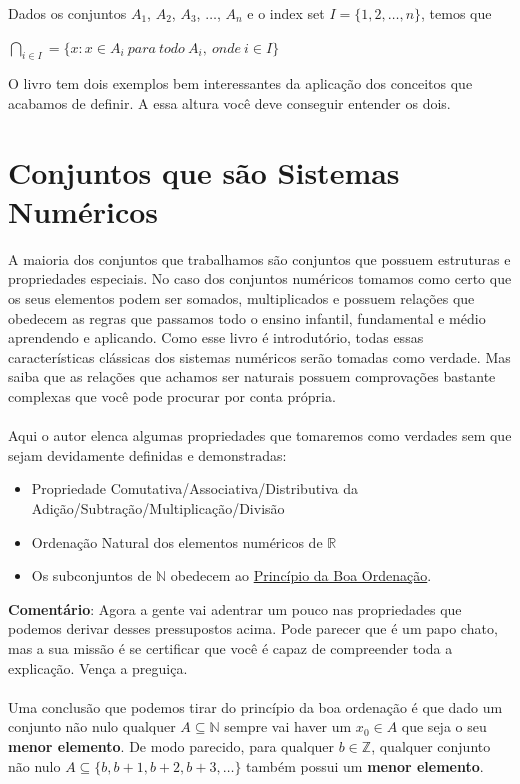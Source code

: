 \documentclass[main.tex]{subfiles}
\begin{document}
\begin{definition}
Dados os conjuntos $A_1$, $A_2$, $A_3$, $\dots$, $A_n$ e o index set $I = \{ 1 , 2 , \dots , n \}$, temos que
\begin{center}
	$\bigcap_{i \in I}\limits = \{ x : x \in A_i \ para \ todo \ A_i, \ onde \  i \in I \}$
\end{center}
\end{definition}

O livro tem dois exemplos bem interessantes da aplicação dos conceitos que acabamos de definir. A essa altura você deve conseguir entender os dois.

\section{Conjuntos que são Sistemas Numéricos}

A maioria dos conjuntos que trabalhamos são conjuntos que possuem estruturas e propriedades especiais. No caso dos conjuntos numéricos tomamos como certo que os seus elementos podem ser somados, multiplicados e possuem relações que obedecem as regras que passamos todo o ensino infantil, fundamental e médio aprendendo e aplicando. Como esse livro é introdutório, todas essas características clássicas dos sistemas numéricos serão tomadas como verdade. Mas saiba que as relações que achamos ser naturais possuem comprovações bastante complexas que você pode procurar por conta própria.
\\~\\
Aqui o autor elenca algumas propriedades que tomaremos como verdades sem que sejam devidamente definidas e demonstradas:
\begin{itemize}
	\item Propriedade Comutativa/Associativa/Distributiva da Adição/Subtração/Multiplicação/Divisão
	\item Ordenação Natural dos elementos numéricos de $\mathbb{R}$
	\item Os subconjuntos de $\mathbb{N}$ obedecem ao \href{https://pt.wikipedia.org/wiki/Princ%C3%ADpio_da_boa_ordena%C3%A7%C3%A3o}{Princípio da Boa Ordenação}.
\end{itemize}

\textbf{Comentário}: Agora a gente vai adentrar um pouco nas propriedades que podemos derivar desses pressupostos acima. Pode parecer que é um papo chato, mas a sua missão é se certificar que você é capaz de compreender toda a explicação. Vença a preguiça.
\\~\\
Uma conclusão que podemos tirar do princípio da boa ordenação é que dado um conjunto não nulo qualquer $A \subseteq \mathbb{N}$ sempre vai haver um $x_0 \in A$ que seja o seu \textbf{menor elemento}. De modo parecido, para qualquer $b \in \mathbb{Z}$, qualquer conjunto não nulo $A \subseteq \{ b, b+1, b+2, b+3, \dots \}$ também possui um \textbf{menor elemento}.
\end{document}
